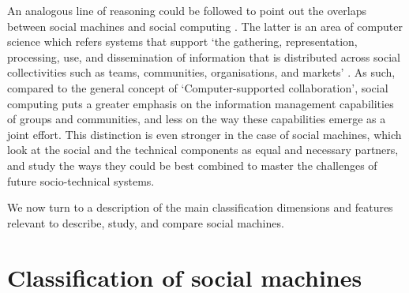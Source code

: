 \documentclass{sig-alternate}
\begin{document}
An analogous line of reasoning could be followed to point out the overlaps between social machines and social computing \cite{parameswaran2007research}. The latter is an area of computer science which refers systems that support `the gathering, representation, processing, use, and dissemination of information that is distributed across social collectivities such as teams, communities, organisations, and markets' \cite{parameswaran2007research}. As such, compared to the general concept of `Computer-supported collaboration', social computing puts a greater emphasis on the information management capabilities of groups and communities, and less on the way these capabilities emerge as a joint effort. This distinction is even stronger in the case of social machines, which look at the social and the technical components as equal and necessary partners, and study the ways they could be best combined to master the challenges of future socio-technical systems.

We now turn to a description of the main classification dimensions and features relevant to describe, study, and compare social machines.

\section{Classification of social machines}
\label{sec:framework}
\end{document}
